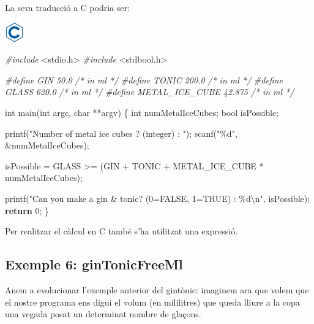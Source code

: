 \documentclass[
]{book}
\newenvironment{Shaded}{\begin{snugshade}}{\end{snugshade}}
\newcommand{\CommentTok}[1]{\textcolor[rgb]{0.56,0.35,0.01}{\textit{#1}}}
\newcommand{\ControlFlowTok}[1]{\textcolor[rgb]{0.13,0.29,0.53}{\textbf{#1}}}
\newcommand{\DataTypeTok}[1]{\textcolor[rgb]{0.13,0.29,0.53}{#1}}
\newcommand{\DecValTok}[1]{\textcolor[rgb]{0.00,0.00,0.81}{#1}}
\newcommand{\ImportTok}[1]{#1}
\newcommand{\NormalTok}[1]{#1}
\newcommand{\PreprocessorTok}[1]{\textcolor[rgb]{0.56,0.35,0.01}{\textit{#1}}}
\newcommand{\SpecialCharTok}[1]{\textcolor[rgb]{0.00,0.00,0.00}{#1}}
\newcommand{\StringTok}[1]{\textcolor[rgb]{0.31,0.60,0.02}{#1}}
\begin{document}
La seva traducció a C podria ser:

\includegraphics{./img/c.png}

\begin{Shaded}
\begin{Highlighting}[]
\PreprocessorTok{\#include }\ImportTok{\textless{}stdio.h\textgreater{}}
\PreprocessorTok{\#include }\ImportTok{\textless{}stdbool.h\textgreater{}}

\PreprocessorTok{\#define GIN 50.0              }\CommentTok{/* in ml */}
\PreprocessorTok{\#define TONIC 200.0           }\CommentTok{/* in ml */}
\PreprocessorTok{\#define GLASS 620.0           }\CommentTok{/* in ml */}
\PreprocessorTok{\#define METAL\_ICE\_CUBE 42.875 }\CommentTok{/* in ml */}\PreprocessorTok{ }

\DataTypeTok{int}\NormalTok{ main(}\DataTypeTok{int}\NormalTok{ argc, }\DataTypeTok{char}\NormalTok{ **argv) \{}
    \DataTypeTok{int}\NormalTok{ numMetalIceCubes;}
    \DataTypeTok{bool}\NormalTok{ isPossible;}

\NormalTok{    printf(}\StringTok{"Number of metal ice cubes ? (integer) : "}\NormalTok{);}
\NormalTok{    scanf(}\StringTok{"\%d"}\NormalTok{, \&numMetalIceCubes);}

\NormalTok{    isPossible = GLASS \textgreater{}= (GIN + TONIC + METAL\_ICE\_CUBE * numMetalIceCubes);}

\NormalTok{    printf(}\StringTok{"Can you make a gin \& tonic? (0=FALSE, 1=TRUE) : \%d}\SpecialCharTok{\textbackslash{}n}\StringTok{"}\NormalTok{, isPossible);}
    \ControlFlowTok{return} \DecValTok{0}\NormalTok{;}
\NormalTok{\}}
\end{Highlighting}
\end{Shaded}

Per realitzar el càlcul en C també s'ha utilitzat una expressió.

\hypertarget{exemple-6-gintonicfreeml}{%
\subsection{Exemple 6: ginTonicFreeMl}\label{exemple-6-gintonicfreeml}}

Anem a evolucionar l'exemple anterior del gintònic: imaginem ara que volem que el nostre programa ens digui el volum (en mililitres) que queda lliure a la copa una vegada posat un determinat nombre de glaçons.
\end{document}
